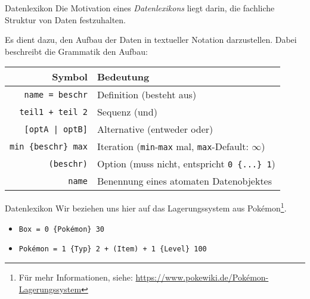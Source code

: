 \begin{defi}{Datenlexikon}
    Die Motivation eines \emph{Datenlexikons} liegt darin, die fachliche Struktur von Daten festzuhalten.

    Es dient dazu, den Aufbau der Daten in textueller Notation darzustellen.
    Dabei beschreibt die Grammatik den Aufbau:

    \begin{center}
        \begin{tabular}{r|l}
            \bfseries Symbol            & \bfseries Bedeutung                                                       \\
            \hline
            \texttt{name = beschr}      & Definition (besteht aus)                                                  \\
            \texttt{teil1 + teil 2}     & Sequenz (und)                                                             \\
            \texttt{[optA | optB]}      & Alternative (entweder oder)                                               \\
            \texttt{min \{beschr\} max} & Iteration (\texttt{min}-\texttt{max} mal, \texttt{max}-Default: $\infty$) \\
            \texttt{(beschr)}           & Option (muss nicht, entspricht \texttt{0 \{...\} 1})                      \\
            \texttt{name}               & Benennung eines atomaten Datenobjektes
        \end{tabular}
    \end{center}
\end{defi}

\begin{example}{Datenlexikon}
    Wir beziehen uns hier auf das Lagerungssystem aus Pokémon\footnote{Für mehr Informationen, siehe:  \href{https://www.pokewiki.de/Pokémon-Lagerungssystem}{https://www.pokewiki.de/Pokémon-Lagerungssystem}}.
    \begin{itemize}
        \item \texttt{Box = 0 \{Pokémon\} 30}
        \item \texttt{Pokémon = 1 \{Typ\} 2 + (Item) + 1 \{Level\} 100}
    \end{itemize}
\end{example}

